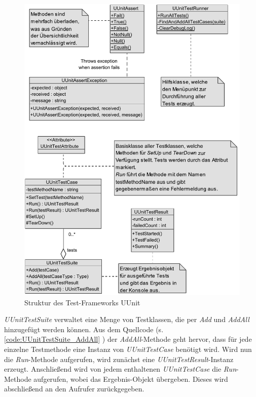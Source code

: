 \clearpage
\begin{figure}
\centering
\includegraphics[width=0.9\linewidth]{images/Kapitel_ErstentwurfDesFrameworks/UUnitStruktur}
\caption[Struktur des Test-Frameworks UUnit]{Struktur des Test-Frameworks UUnit}
\label{fig:UUnitStruktur}
\end{figure}
\clearpage

\textit{UUnitTestSuite} verwaltet eine Menge von Testklassen, die per \textit{Add} und \textit{AddAll} hinzugefügt werden können. Aus dem Quellcode (s. \autoref{code:UUnitTestSuite_AddAll} ) der \textit{AddAll}-Methode geht hervor, dass für jede einzelne Testmethode eine Instanz von \textit{UUnitTestCase} benötigt wird. Wird nun die \textit{Run}-Methode aufgerufen, wird zunächst eine \textit{UUnitTestResult}-Instanz erzeugt. Anschließend wird von jedem enthaltenen \textit{UUnitTestCase} die \textit{Run}-Methode aufgerufen, wobei das Ergebnis-Objekt übergeben. Dieses wird abschließend an den Aufrufer zurückgegeben.

